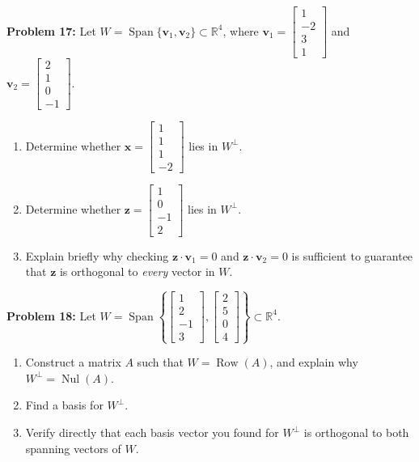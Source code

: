 \documentclass[11pt, letterpaper]{article}
\theoremstyle{definition}
\theoremstyle{remark}
\begin{document}
\textbf{Problem 17:} Let $W = \operatorname{Span}\{\mathbf{v}_1, \mathbf{v}_2\} \subset \mathbb{R}^4$, where $\mathbf{v}_1 = \begin{bmatrix} 1 \\ -2 \\ 3 \\ 1 \end{bmatrix}$ and $\mathbf{v}_2 = \begin{bmatrix} 2 \\ 1 \\ 0 \\ -1 \end{bmatrix}$.
\begin{enumerate}[label=(\alph*)]
    \item Determine whether $\mathbf{x} = \begin{bmatrix} 1 \\ 1 \\ 1 \\ -2 \end{bmatrix}$ lies in $W^{\perp}$.
    \item Determine whether $\mathbf{z} = \begin{bmatrix} 1 \\ 0 \\ -1 \\ 2 \end{bmatrix}$ lies in $W^{\perp}$.
    \item Explain briefly why checking $\mathbf{z} \cdot \mathbf{v}_1 = 0$ and $\mathbf{z} \cdot \mathbf{v}_2 = 0$ is sufficient to guarantee that $\mathbf{z}$ is orthogonal to \emph{every} vector in $W$.
\end{enumerate}

\textbf{Problem 18:} Let $W = \operatorname{Span}\left\{\begin{bmatrix} 1 \\ 2 \\ -1 \\ 3 \end{bmatrix}, \begin{bmatrix} 2 \\ 5 \\ 0 \\ 4 \end{bmatrix}\right\} \subset \mathbb{R}^4$.
\begin{enumerate}[label=(\alph*)]
    \item Construct a matrix $A$ such that $W = \operatorname{Row}(A)$, and explain why $W^{\perp} = \operatorname{Nul}(A)$.
    \item Find a basis for $W^{\perp}$.
    \item Verify directly that each basis vector you found for $W^{\perp}$ is orthogonal to both spanning vectors of $W$.
\end{enumerate}
\end{document}
